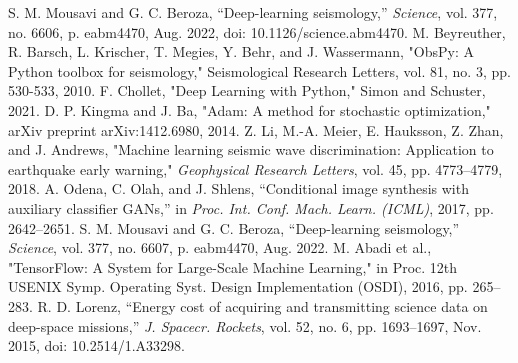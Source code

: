 \documentclass[conference]{IEEEtran}
\begin{document}
\begin{thebibliography}{00}
     S. M. Mousavi and G. C. Beroza, ``Deep-learning seismology,'' \emph{Science}, vol. 377, no. 6606, p. eabm4470, Aug. 2022, doi: 10.1126/science.abm4470.   
     M. Beyreuther, R. Barsch, L. Krischer, T. Megies, Y. Behr, and J. Wassermann, "ObsPy: A Python toolbox for seismology," Seismological Research Letters, vol. 81, no. 3, pp. 530-533, 2010.
     F. Chollet, "Deep Learning with Python," Simon and Schuster, 2021.
     D. P. Kingma and J. Ba, "Adam: A method for stochastic optimization," arXiv preprint arXiv:1412.6980, 2014.
     Z. Li, M.-A. Meier, E. Hauksson, Z. Zhan, and J. Andrews, "Machine learning seismic wave discrimination: Application to earthquake early warning," \emph{Geophysical Research Letters}, vol. 45, pp. 4773–4779, 2018.
     A. Odena, C. Olah, and J. Shlens, ``Conditional image synthesis with auxiliary classifier GANs,'' in \emph{Proc. Int. Conf. Mach. Learn. (ICML)}, 2017, pp. 2642--2651.
     S. M. Mousavi and G. C. Beroza, ``Deep-learning seismology,'' \emph{Science}, vol. 377, no. 6607, p. eabm4470, Aug. 2022.   %
     M. Abadi et al., "TensorFlow: A System for Large-Scale Machine Learning," in Proc. 12th USENIX Symp. Operating Syst. Design Implementation (OSDI), 2016, pp. 265--283.
     R. D. Lorenz, ``Energy cost of acquiring and transmitting science data on deep-space missions,'' \emph{J. Spacecr. Rockets}, vol. 52, no. 6, pp. 1693--1697, Nov. 2015, doi: 10.2514/1.A33298.

\end{thebibliography}
\end{document}

